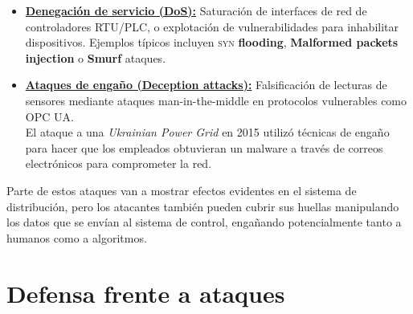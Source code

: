 \begin{itemize}[itemsep=0.5em]
   \item \textbf{\ul{Denegación de servicio (DoS):}} Saturación de interfaces de red de controladores \textsc{RTU/PLC}, o explotación de vulnerabilidades para inhabilitar dispositivos. Ejemplos típicos incluyen \textsc{syn} \textbf{flooding}, \textbf{Malformed packets injection} o \textbf{Smurf} ataques.
   
   \item \textbf{\ul{Ataques de engaño (Deception attacks):}} Falsificación de lecturas de sensores mediante ataques man-in-the-middle en protocolos vulnerables como OPC UA.\\
   El ataque a una \textit{Ukrainian Power Grid} en 2015 utilizó técnicas de engaño para hacer que los empleados obtuvieran un malware a través de correos electrónicos para comprometer la red.
\end{itemize}

Parte de estos ataques van a mostrar efectos evidentes en el sistema de distribución, pero los atacantes también pueden cubrir sus huellas manipulando los datos que se envían al sistema de control, engañando potencialmente tanto a humanos como a algoritmos.

\section{Defensa frente a ataques}

